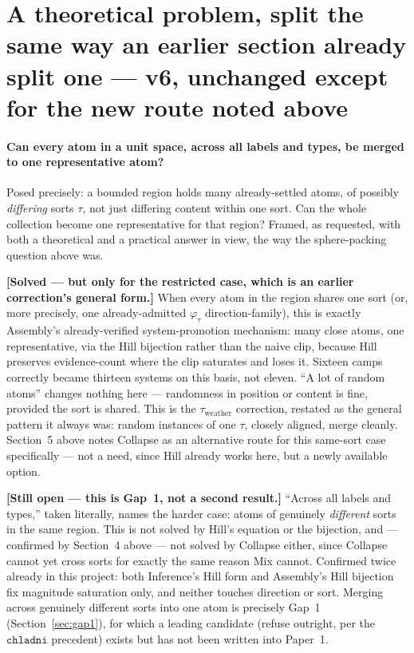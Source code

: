 \documentclass[11pt]{article}
\begin{document}
\section{A theoretical problem, split the same way an earlier section
already split one --- v6, unchanged except for the new route noted
above}
\label{sec:v6}

\paragraph{Can every atom in a unit space, across all labels and
types, be merged to one representative atom?} Posed precisely: a
bounded region holds many already-settled atoms, of possibly
\emph{differing} sorts $\tau$, not just differing content within one
sort. Can the whole collection become one representative for that
region? Framed, as requested, with both a theoretical and a practical
answer in view, the way the sphere-packing question above was.

\textbf{[Solved --- but only for the restricted case, which is an
earlier correction's general form.]} When every atom in the
region shares one sort (or, more precisely, one already-admitted
$\varphi_\tau$ direction-family), this is exactly
Assembly's already-verified system-promotion mechanism: many close
atoms, one representative, via the Hill bijection rather than the
naive clip, because Hill preserves evidence-count where the clip
saturates and loses it. Sixteen camps correctly became thirteen
systems on this basis, not eleven. ``A lot of random atoms'' changes
nothing here --- randomness in position or content is fine, provided
the sort is shared. This is the $\tau_{\text{weather}}$
correction, restated as the general pattern it always was: random
instances of one $\tau$, closely aligned, merge cleanly. Section~5
above notes Collapse as an alternative route for this same-sort case
specifically --- not a need, since Hill already works here, but a
newly available option.

\textbf{[Still open --- this is Gap~1, not a second result.]} ``Across
all labels and types,'' taken literally, names the harder case: atoms
of genuinely \emph{different} sorts in the same region. This is not
solved by Hill's equation or the bijection, and --- confirmed by
Section~4 above --- not solved by Collapse either, since Collapse
cannot yet cross sorts for exactly the same reason Mix cannot.
Confirmed twice already in this project: both Inference's Hill form
and Assembly's Hill bijection fix magnitude saturation only, and
neither touches direction or sort. Merging across genuinely different
sorts into one atom is precisely Gap~1 (Section~\ref{sec:gap1}), for
which a leading candidate (refuse outright, per the $\mathtt{chladni}$
precedent) exists but has not been written into Paper~1.
\end{document}
